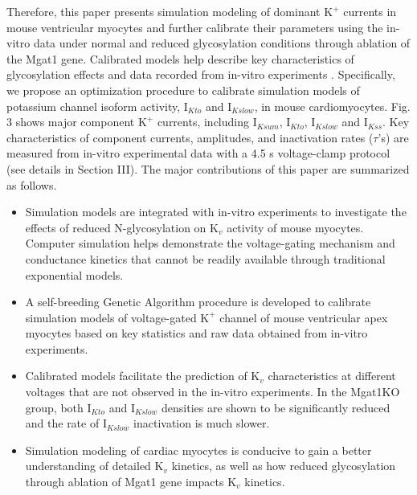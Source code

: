\documentclass[journal]{IEEEtran}
\begin{document}
Therefore, this paper presents simulation modeling of dominant $\text{K}^{+}$ currents in mouse ventricular myocytes and further calibrate their parameters using the in-vitro data under normal and reduced glycosylation conditions through ablation of the Mgat1 gene. Calibrated models help describe key characteristics of glycosylation effects and data recorded from in-vitro experiments \cite{ednie2019reduced}. Specifically, we propose an optimization procedure to calibrate simulation models of potassium channel isoform activity, $\text{I}_{Kto}$ and $\text{I}_{Kslow}$, in mouse cardiomyocytes.  Fig. 3 shows  major component $\text{K}^{+}$ currents, including $\text{I}_{Ksum}$, $\text{I}_{Kto}$, $\text{I}_{Kslow}$ and $\text{I}_{Kss}$. Key characteristics of component currents, amplitudes, and inactivation rates ($\tau$'s) are measured from in-vitro experimental data with a 4.5 s voltage-clamp protocol (see details in Section III). The major contributions of this paper are summarized as follows.
\begin{itemize}
    \item Simulation models are integrated with in-vitro experiments to investigate the effects of reduced N-glycosylation on $\text{K}_{v}$ activity of mouse myocytes. Computer simulation helps demonstrate the voltage-gating mechanism and conductance kinetics that cannot be readily available through traditional exponential models. 
    \item A self-breeding Genetic Algorithm procedure is developed to calibrate simulation models of voltage-gated $\text{K}^{+}$ channel of mouse ventricular apex myocytes based on key statistics and raw data obtained from in-vitro experiments.
    \item Calibrated models facilitate the prediction of $\text{K}_{v}$ characteristics at different voltages that are not observed in the in-vitro experiments. In the Mgat1KO group, both $\text{I}_{Kto}$ and $\text{I}_{Kslow}$ densities are shown to be significantly reduced and the rate of $\text{I}_{Kslow}$ inactivation is much slower.
    \item Simulation modeling of cardiac myocytes is conducive to gain a better understanding of detailed $\text{K}_{v}$ kinetics, as well as how reduced glycosylation through  ablation of Mgat1 gene impacts $\text{K}_{v}$ kinetics.
\end{itemize}

\end{document}
